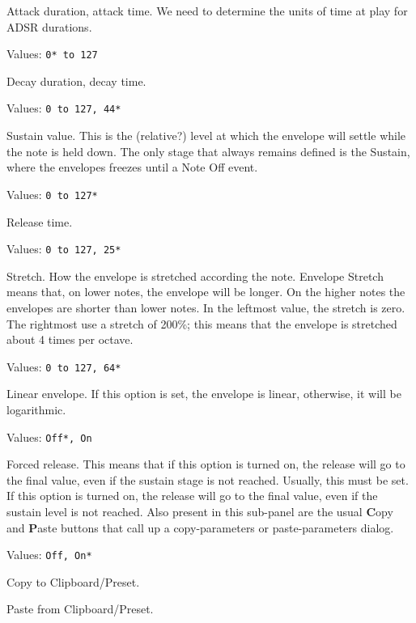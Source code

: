    \setcounter{ItemCounter}{0}      %

   Attack duration, attack time.
   We need to determine the units of time at play for ADSR durations.

   Values: \texttt{0* to 127}

   Decay duration, decay time.

   Values: \texttt{0 to 127, 44*}

   Sustain value.
   This is the (relative?) level at which the envelope will settle
   while the note is held down.
   The only stage that always remains defined is the Sustain, where the
   envelopes freezes until a Note Off event.

   Values: \texttt{0 to 127*}

   Release time.

   Values: \texttt{0 to 127, 25*}

   Stretch.
   How the envelope is stretched according the note.
   Envelope Stretch means that, on lower notes, the envelope will be longer.
   On the higher notes the envelopes are shorter than lower notes. In the
   leftmost value, the stretch is zero. The rightmost use a stretch of 200\%;
   this means that the envelope is stretched about 4 times per octave.

   Values: \texttt{0 to 127, 64*}

   Linear envelope.
   If this option is set, the envelope is linear, otherwise, it will be
   logarithmic.

   Values: \texttt{Off*, On}

   Forced release.
   This means that if this option is turned on, the release will go to the
   final value, even if the sustain stage is not reached. Usually, this must
   be set.
   If this option is turned on, the release will go to the
   final value, even if the sustain level is not reached.
   Also present in this sub-panel are the usual \textbf{C}opy
   and \textbf{P}aste buttons that call up a copy-parameters or
   paste-parameters dialog.

   Values: \texttt{Off, On*}

   Copy to Clipboard/Preset.

   Paste from Clipboard/Preset.

